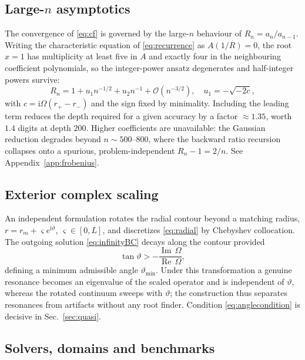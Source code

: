\documentclass[aps,prd,reprint,superscriptaddress,nofootinbib,longbibliography]{revtex4-2}
\theoremstyle{plain}
\theoremstyle{definition}
\theoremstyle{remark}
\newcommand{\Rem}{\operatorname{Re}}
\newcommand{\Imm}{\operatorname{Im}}
\newcommand{\ii}{\mathrm{i}}
\newcommand{\Ord}{\mathcal{O}}
\begin{document}
\subsection{Large-$n$ asymptotics}\label{sec:num:tail}

The convergence of \eqref{eq:cf} is governed by the large-$n$ behaviour of
$R_n=a_n/a_{n-1}$. Writing the characteristic equation of
\eqref{eq:recurrence} as $A(1/R)=0$, the root $x=1$ has multiplicity at least
five in $A$ and exactly four in the neighbouring coefficient polynomials, so the
integer-power ansatz degenerates and half-integer powers survive:
\begin{equation}\label{eq:tail}
  R_n = 1+u_1n^{-1/2}+u_2n^{-1}+\Ord(n^{-3/2}),\quad
  u_1=-\sqrt{-2c},
\end{equation}
with $c=\ii\Omega(r_+-r_-)$ and the sign fixed by minimality. Including the
leading term reduces the depth required for a given accuracy by a factor
$\approx1.35$, worth $1.4$ digits at depth $200$. Higher coefficients are
unavailable: the Gaussian reduction degrades beyond $n\sim500$--$800$, where the
backward ratio recursion collapses onto a spurious, problem-independent
$R_n-1=2/n$. See Appendix~\ref{app:frobenius}.

\subsection{Exterior complex scaling}\label{sec:num:scaling}

An independent formulation rotates the radial contour beyond a matching radius,
$r=r_m+\varsigma e^{\ii\vartheta}$, $\varsigma\in[0,L]$, and discretizes
\eqref{eq:radial} by Chebyshev collocation. The outgoing solution
\eqref{eq:infinityBC} decays along the contour provided
\begin{equation}\label{eq:anglecondition}
  \tan\vartheta > -\frac{\Imm\,\Omega}{\Rem\,\Omega},
\end{equation}
defining a minimum admissible angle $\vartheta_{\min}$. Under this
transformation a genuine resonance becomes an eigenvalue of the scaled operator
and is independent of $\vartheta$, whereas the rotated continuum sweeps with
$\vartheta$; the construction thus separates resonances from artifacts without
any root finder. Condition \eqref{eq:anglecondition} is decisive in
Sec.~\ref{sec:quasi}.

\subsection{Solvers, domains and benchmarks}\label{sec:num:domains}
\end{document}

